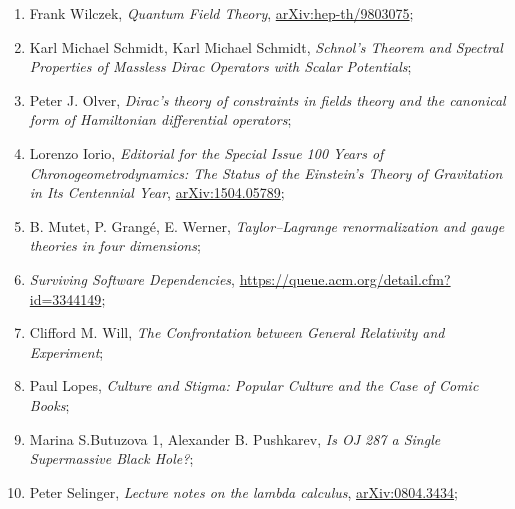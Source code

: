 \documentclass[a4paper,11pt]{article}
\begin{document}
\begin{enumerate}
\item Frank Wilczek, \textit{Quantum Field Theory},
  \href{https://arxiv.org/abs/hep-th/9803075v2}{arXiv:hep-th/9803075};



\item Karl Michael Schmidt, Karl Michael Schmidt, \textit{Schnol’s
    Theorem and Spectral Properties of Massless Dirac Operators with
    Scalar Potentials};



\item Peter J. Olver, \textit{Dirac’s theory of constraints in fields
    theory and the canonical form of Hamiltonian differential
    operators};



\item Lorenzo Iorio, \textit{Editorial for the Special Issue 100 Years
    of Chronogeometrodynamics: The Status of the Einstein's Theory of
    Gravitation in Its Centennial Year},
  \href{https://arxiv.org/abs/1504.05789v2}{arXiv:1504.05789};



\item B. Mutet, P. Grang\'{e}, E. Werner, \textit{Taylor–Lagrange
    renormalization and gauge theories in four dimensions};



\item \textit{Surviving Software Dependencies},
  \href{https://queue.acm.org/detail.cfm?id=3344149}{https://queue.acm.org/detail.cfm?id=3344149};



\item Clifford M. Will, \textit{The Confrontation between General
    Relativity and Experiment};



\item Paul Lopes, \textit{Culture and Stigma: Popular Culture and the
    Case of Comic Books};



\item Marina S.Butuzova 1, Alexander B. Pushkarev, \textit{Is OJ 287 a
    Single Supermassive Black Hole?};



\item Peter Selinger, \textit{Lecture notes on the lambda calculus},
  \href{https://arxiv.org/abs/0804.3434v2}{arXiv:0804.3434};




\end{enumerate}
\end{document}
